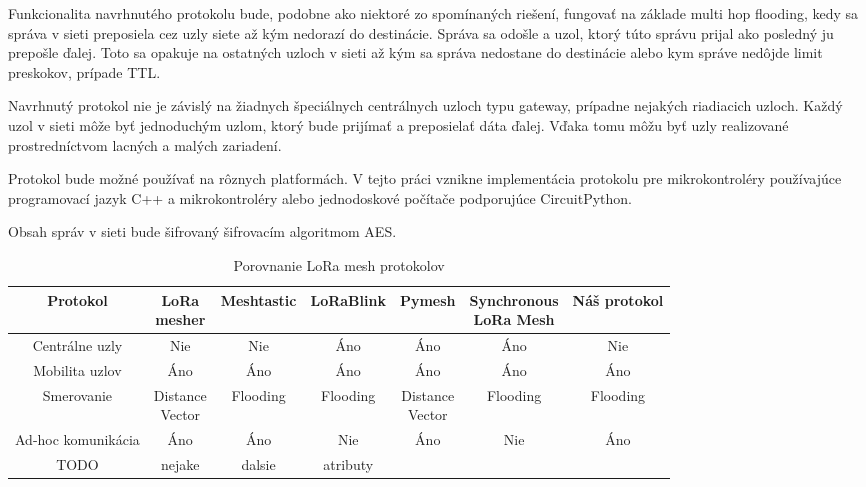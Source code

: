 \documentclass[slovak,master]{diploma}
\renewcommand{\thefootnote}{\arabic{footnote}}
\begin{document}
Funkcionalita navrhnutého protokolu bude, podobne ako niektoré zo spomínaných riešení, fungovať na základe multi hop flooding, kedy sa správa v sieti preposiela cez uzly siete až kým nedorazí do destinácie.
Správa sa odošle a uzol, ktorý túto správu prijal ako posledný ju prepošle ďalej. Toto sa opakuje na ostatných uzloch v sieti až kým sa správa nedostane do destinácie alebo kym správe nedôjde limit preskokov, prípade TTL.

Navrhnutý protokol nie je závislý na žiadnych špeciálnych centrálnych uzloch typu gateway, prípadne nejakých riadiacich uzloch. Každý uzol v sieti môže byť jednoduchým uzlom, ktorý bude prijímať a preposielať dáta ďalej.
Vďaka tomu môžu byť uzly realizované prostredníctvom lacných a malých zariadení.

Protokol bude možné používať na rôznych platformách. V tejto práci vznikne implementácia protokolu pre mikrokontroléry používajúce programovací jazyk C++ a 
mikrokontroléry alebo jednodoskové počítače podporujúce CircuitPython.

Obsah správ v sieti bude šifrovaný šifrovacím algoritmom AES.


\renewcommand{\thefootnote}{\fnsymbol{footnote}}
\begin{table}[!h]
	\centering
  \small
  \setlength\tabcolsep{3pt}
	\caption[Porovnanie LoRa mesh protokolov]{Porovnanie LoRa mesh protokolov}
  \begin{tabular}{c|c|c|c|c|c|c}
    \toprule %
    Protokol  & \makecell{LoRa \\ mesher} & Meshtastic & LoRaBlink & Pymesh & \makecell{Synchronous\\ LoRa Mesh} & Náš protokol\\
    \midrule
    Centrálne uzly & Nie & Nie & Áno & Áno & Áno & Nie \\
    \hline
    Mobilita uzlov & Áno\footnotemark[7] & Áno & Áno\footnotemark[1] & Áno\footnotemark[7] & Áno\footnotemark[1] & Áno\\
    \hline
    Smerovanie & \makecell{Distance \\ Vector} & Flooding & Flooding & \makecell{Distance \\ Vector} & Flooding & Flooding\\
    \hline
    Ad-hoc komunikácia & Áno & Áno & Nie & Áno & Nie & Áno \\
    \hline
    TODO  & nejake & dalsie  & atributy & \\
    \midrule
  \end{tabular}
  \label{tab:compar}
\end{table}
\renewcommand{\thefootnote}{\arabic{footnote}}
\end{document}
